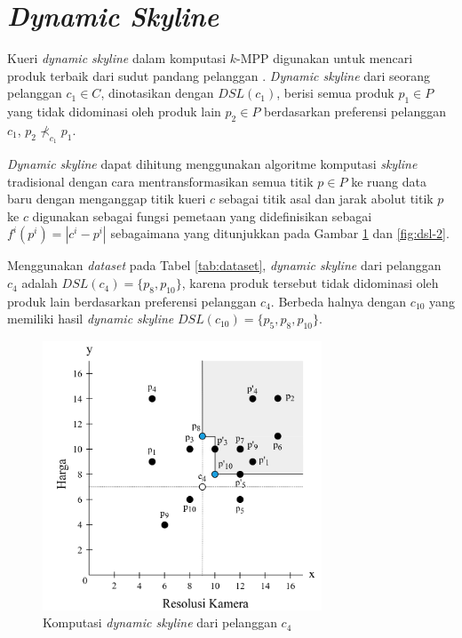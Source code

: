 \section{\textit{Dynamic Skyline}}

\tab Kueri \textit{dynamic skyline} dalam komputasi $k$-MPP digunakan untuk mencari produk terbaik dari sudut pandang pelanggan \cite{kmpp}. \textit{Dynamic skyline} \cite{dynamic-skyline} dari seorang pelanggan $c_1 \in C$, dinotasikan dengan $DSL(c_1)$, berisi semua produk $p_1 \in P$ yang tidak didominasi oleh produk lain $p_2 \in P$ berdasarkan preferensi pelanggan $c_1$, $p_2 \nprec_{c_1} p_1$.

\textit{Dynamic skyline} dapat dihitung menggunakan algoritme komputasi \textit{skyline} tradisional \cite{skyline} dengan cara mentransformasikan semua titik $p \in P$ ke ruang data baru dengan menganggap titik kueri $c$ sebagai titik asal dan jarak abolut titik $p$ ke $c$ digunakan sebagai fungsi pemetaan yang didefinisikan sebagai $f^i (p^i) = |c^i-p^i|$ sebagaimana yang ditunjukkan pada Gambar \ref{fig:dsl-1} dan \ref{fig:dsl-2}.

Menggunakan \textit{dataset} pada Tabel \ref{tab:dataset}, \textit{dynamic skyline} dari pelanggan $c_4$ adalah $DSL(c_4) = \{p_8, p_{10}\}$, karena produk tersebut tidak didominasi oleh produk lain berdasarkan preferensi pelanggan $c_4$. Berbeda halnya dengan $c_{10}$ yang memiliki hasil \textit{dynamic skyline} $DSL(c_{10}) = \{p_5, p_8, p_{10}\}$. 

\begin{figure}[h]
	\centering
	\includegraphics[height=8cm]{assets/img/bab2/dsl-1.png}
	\caption{Komputasi \textit{dynamic skyline} dari pelanggan $c_{4}$}
	\label{fig:dsl-1}
\end{figure}

